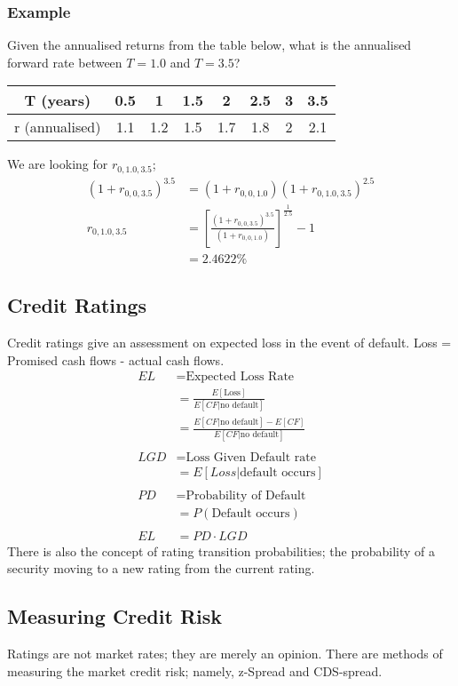 \documentclass[a4paper]{article}
\begin{document}
\subsubsection{Example}
Given the annualised returns from the table below, what is the annualised forward
rate between $T=1.0$ and $T=3.5$?
\begin{center}
\begin{tabular}{|c|c|c|c|c|c|c|c|}
\hline
T (years)      & 0.5 & 1   & 1.5 & 2   & 2.5 & 3 & 3.5 \\ \hline
r (annualised) & 1.1 & 1.2 & 1.5 & 1.7 & 1.8 & 2 & 2.1 \\ \hline
\end{tabular}
\end{center}
We are looking for $r_{0,1.0,3.5}$; 
\begin{align*}
(1 + r_{0,0,3.5})^{3.5} &= (1 + r_{0,0,1.0})(1 + r_{0,1.0,3.5})^{2.5}\\
r_{0,1.0,3.5} &= \left[ \frac{(1 + r_{0,0,3.5})^{3.5}}{(1 + r_{0,0,1.0})} \right ]^{\frac{1}{2.5}} - 1 \\
 &= 2.4622\%
\end{align*}


\subsection{Credit Ratings}
Credit ratings give an assessment on expected loss in the event of default.
Loss = Promised cash flows - actual cash flows.
\begin{align*}
EL &= \text{Expected Loss Rate}\\
&= \frac{E[\text{Loss}]}{E[CF|\text{no default}]}\\
&= \frac{E[CF|\text{no default}] - E[CF]}{E[CF|\text{no default}]} \\\\
LGD &= \text{Loss Given Default rate}\\
&= E[Loss | \text{default occurs}]\\\\
PD &=  \text{Probability of Default}\\
&= P(\text{Default occurs})\\\\
EL &= PD \cdot LGD
\end{align*}
There is also the concept of rating transition probabilities; the probability
of a security moving to a new rating from the current rating.
\subsection{Measuring Credit Risk}
Ratings are not market rates; they are merely an opinion.
There are methods of measuring the market credit risk; namely, z-Spread and
CDS-spread.
\end{document}
